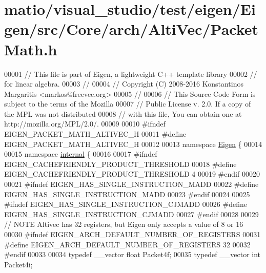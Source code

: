 \hypertarget{matio_2visual__studio_2test_2eigen_2_eigen_2src_2_core_2arch_2_alti_vec_2_packet_math_8h_source}{}\section{matio/visual\+\_\+studio/test/eigen/\+Eigen/src/\+Core/arch/\+Alti\+Vec/\+Packet\+Math.h}
\label{matio_2visual__studio_2test_2eigen_2_eigen_2src_2_core_2arch_2_alti_vec_2_packet_math_8h_source}

\begin{DoxyCode}
00001 \textcolor{comment}{// This file is part of Eigen, a lightweight C++ template library}
00002 \textcolor{comment}{// for linear algebra.}
00003 \textcolor{comment}{//}
00004 \textcolor{comment}{// Copyright (C) 2008-2016 Konstantinos Margaritis <markos@freevec.org>}
00005 \textcolor{comment}{//}
00006 \textcolor{comment}{// This Source Code Form is subject to the terms of the Mozilla}
00007 \textcolor{comment}{// Public License v. 2.0. If a copy of the MPL was not distributed}
00008 \textcolor{comment}{// with this file, You can obtain one at http://mozilla.org/MPL/2.0/.}
00009 
00010 \textcolor{preprocessor}{#ifndef EIGEN\_PACKET\_MATH\_ALTIVEC\_H}
00011 \textcolor{preprocessor}{#define EIGEN\_PACKET\_MATH\_ALTIVEC\_H}
00012 
00013 \textcolor{keyword}{namespace }\hyperlink{namespace_eigen}{Eigen} \{
00014 
00015 \textcolor{keyword}{namespace }\hyperlink{namespaceinternal}{internal} \{
00016 
00017 \textcolor{preprocessor}{#ifndef EIGEN\_CACHEFRIENDLY\_PRODUCT\_THRESHOLD}
00018 \textcolor{preprocessor}{#define EIGEN\_CACHEFRIENDLY\_PRODUCT\_THRESHOLD 4}
00019 \textcolor{preprocessor}{#endif}
00020 
00021 \textcolor{preprocessor}{#ifndef EIGEN\_HAS\_SINGLE\_INSTRUCTION\_MADD}
00022 \textcolor{preprocessor}{#define EIGEN\_HAS\_SINGLE\_INSTRUCTION\_MADD}
00023 \textcolor{preprocessor}{#endif}
00024 
00025 \textcolor{preprocessor}{#ifndef EIGEN\_HAS\_SINGLE\_INSTRUCTION\_CJMADD}
00026 \textcolor{preprocessor}{#define EIGEN\_HAS\_SINGLE\_INSTRUCTION\_CJMADD}
00027 \textcolor{preprocessor}{#endif}
00028 
00029 \textcolor{comment}{// NOTE Altivec has 32 registers, but Eigen only accepts a value of 8 or 16}
00030 \textcolor{preprocessor}{#ifndef EIGEN\_ARCH\_DEFAULT\_NUMBER\_OF\_REGISTERS}
00031 \textcolor{preprocessor}{#define EIGEN\_ARCH\_DEFAULT\_NUMBER\_OF\_REGISTERS  32}
00032 \textcolor{preprocessor}{#endif}
00033 
00034 \textcolor{keyword}{typedef} \_\_vector \textcolor{keywordtype}{float}          Packet4f;
00035 \textcolor{keyword}{typedef} \_\_vector \textcolor{keywordtype}{int}            Packet4i;

\end{DoxyCode}
